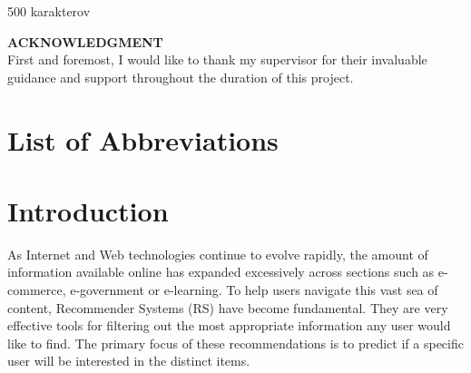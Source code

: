 \documentclass[\myFontSize,oneside,english,hidelinks,a4paper]{article}
\begin{document}
500 karakterov 






\newpage 			%
\setcounter{page}{4}
\vspace*{\fill} 
\noindent \Large \textbf{ACKNOWLEDGMENT}\\
\noindent First and foremost, I would like to thank my supervisor for their invaluable guidance and support throughout the duration of this project.
\vspace*{\fill} 
\vspace{-8cm} 





\newpage{} 

\setcounter{page}{5}
\tableofcontents
\newpage{}
\listoffigures
\listoftables
\section*{List of Abbreviations}

\clearpage{} 
\setcounter{page}{1}

\section{Introduction}
As Internet and Web technologies continue to evolve rapidly, the amount of information available online has expanded excessively across sections such as e-commerce, e-government or e-learning. To help users navigate this vast sea of content, Recommender Systems (RS) have become fundamental. They are very effective tools for filtering out the most appropriate information any user would like to find. The primary focus of these recommendations is to predict if a specific user will be interested in the distinct items.\\
\end{document}
